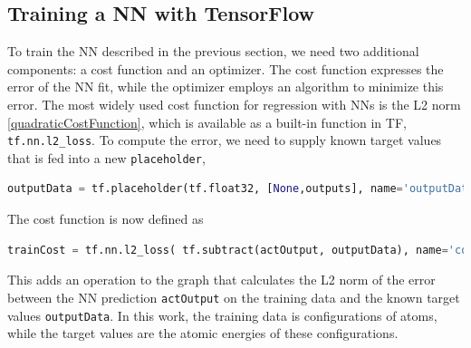 \documentclass[twoside,english]{uiofysmaster}
\begin{document}
\subsection{Training a NN with TensorFlow}
To train the NN described in the previous section, we need two additional components:
a cost function and an optimizer. The cost function expresses the error of the NN fit, while
the optimizer employs an algorithm to minimize this error. The most widely used cost function
for regression with NNs is the L2 norm \eqref{quadraticCostFunction}, which is available as a 
built-in function in TF, \texttt{tf.nn.l2\_loss}. To compute the error, we need to supply known 
target values that is fed into a new \texttt{placeholder},
\begin{lstlisting}[language=Python]
 outputData = tf.placeholder(tf.float32, [None,outputs], name='outputData')
\end{lstlisting}
The cost function is now defined as
\begin{lstlisting}[language=Python]
 trainCost = tf.nn.l2_loss( tf.subtract(actOutput, outputData), name='cost')
\end{lstlisting}
This adds an operation to the graph that calculates the L2 norm of the error between the NN prediction \texttt{actOutput}
on the training data 
and the known target values \texttt{outputData}. In this work, the training data is configurations of atoms, 
while the target values are the atomic energies of these configurations. 
\end{document}
